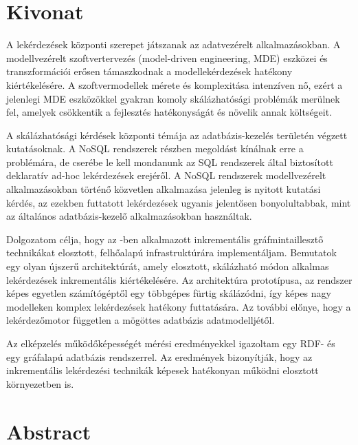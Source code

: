 \chapter*{Kivonat}

A lekérdezések központi szerepet játszanak az adatvezérelt alkalmazásokban. A modellvezérelt szoftvertervezés (model-driven engineering, MDE) eszközei és transzformációi erősen támaszkodnak a modellekérdezések hatékony kiértékelésére. A szoftvermodellek mérete és komplexitása intenzíven nő, ezért a jelenlegi MDE eszközökkel gyakran komoly skálázhatósági problémák merülnek fel, amelyek csökkentik a fejlesztés hatékonyságát és növelik annak költségeit.

A skálázhatósági kérdések központi témája az adatbázis-kezelés területén végzett kutatásoknak. A NoSQL rendszerek részben megoldást kínálnak erre a problémára, de cserébe le kell mondanunk az SQL rendszerek által biztosított deklaratív ad-hoc lekérdezések erejéről. A NoSQL rendszerek modellvezérelt alkalmazásokban történő közvetlen alkalmazása jelenleg is nyitott kutatási kérdés, az ezekben futtatott lekérdezések ugyanis jelentősen bonyolultabbak, mint az általános adatbázis-kezelő alkalmazásokban használtak.

Dolgozatom célja, hogy az \eiq{}-ben alkalmazott inkrementális gráfmintaillesztő technikákat elosztott, felhőalapú infrastruktúrára implementáljam. Bemutatok egy olyan újszerű architektúrát, amely elosztott, skálázható módon alkalmas lekérdezések inkrementális kiértékelésére. Az architektúra prototípusa, az \iqd{} rendszer képes egyetlen számítógéptől egy többgépes fürtig skálázódni, így képes nagy modelleken komplex lekérdezések hatékony futtatására. Az \iqd{} további előnye, hogy a lekérdezőmotor független a mögöttes adatbázis adatmodelljétől.

Az elképzelés működőképességét mérési eredményekkel igazoltam egy RDF- és egy gráfalapú adatbázis rendszerrel. Az eredmények bizonyítják, hogy az inkrementális lekérdezési technikák képesek hatékonyan működni elosztott környezetben is. 

\vfill

\chapter*{Abstract}

